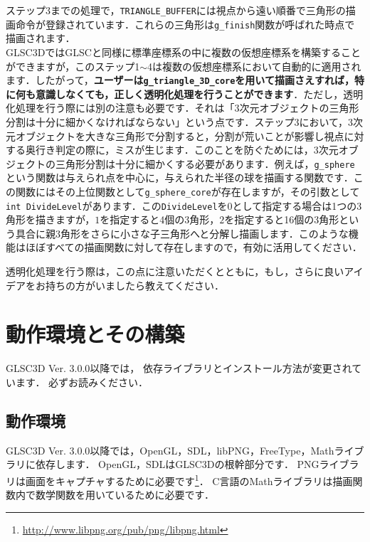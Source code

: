 \documentclass[platex,a4paper,12pt]{jsarticle}%
\begin{document}

ステップ3までの処理で，\verb|TRIANGLE_BUFFER|には視点から遠い順番で三角形の描画命令が登録されています．これらの三角形は\verb|g_finish|関数が呼ばれた時点で描画されます．\\

GLSC3DではGLSCと同様に標準座標系の中に複数の仮想座標系を構築することができますが，このステップ1$\sim$4は複数の仮想座標系において自動的に適用されます．したがって，{\bf ユーザーは\verb|g_triangle_3D_core|を用いて描画さえすれば，特に何も意識しなくても，正しく透明化処理を行うことができます}．ただし，透明化処理を行う際には別の注意も必要です．それは「3次元オブジェクトの三角形分割は十分に細かくなければならない」という点です．ステップ3において，3次元オブジェクトを大きな三角形で分割すると，分割が荒いことが影響し視点に対する奥行き判定の際に，ミスが生じます．このことを防ぐためには，3次元オブジェクトの三角形分割は十分に細かくする必要があります．例えば，\verb|g_sphere|という関数は与えられ点を中心に，与えられた半径の球を描画する関数です．この関数にはその上位関数として\verb|g_sphere_core|が存在しますが，その引数として\verb|int DivideLevel|があります．この\verb|DivideLevel|を$0$として指定する場合は1つの3角形を描きますが，$1$を指定すると4個の3角形，$2$を指定すると16個の3角形という具合に親3角形をさらに小さな子三角形へと分解し描画します．このような機能はほぼすべての描画関数に対して存在しますので，有効に活用してください．

透明化処理を行う際は，この点に注意いただくとともに，もし，さらに良いアイデアをお持ちの方がいましたら教えてください．

\newpage
\section{動作環境とその構築}
GLSC3D Ver. 3.0.0以降では，
依存ライブラリとインストール方法が変更されています．
必ずお読みください．

\subsection{動作環境}
GLSC3D Ver. 3.0.0以降では，OpenGL，SDL，libPNG，FreeType，Mathライブラリに依存します．
OpenGL，SDLはGLSC3Dの根幹部分です．
PNGライブラリは画面をキャプチャするために必要です\footnote{\url{http://www.libpng.org/pub/png/libpng.html}}．
C言語のMathライブラリは描画関数内で数学関数を用いているために必要です．
\end{document}
